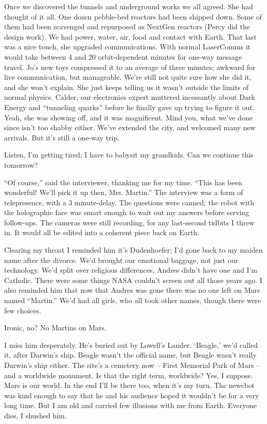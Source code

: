 \documentclass[11pt,a4paper]{article}
\newcommand{\storybreak}{%
  \par\vspace{0.6\baselineskip}
  \begin{center}\color{storyblue}\small *\enspace *\enspace *\end{center}
  \vspace{0.3\baselineskip}\noindent\ignorespaces
}
\begin{document}
Once we discovered the tunnels and underground works we all agreed. She had thought of it all. One dozen pebble-bed reactors had been shipped down. Some of them had been scavenged and repurposed as NextGen reactors (Percy did the design work). We had power, water, air, food and contact with Earth. That last was a nice touch, she upgraded communications. With normal LaserComms it would take between 4 and 20 orbit-dependent minutes for one-way message travel. Jo’s new toys compressed it to an average of three minutes; awkward for live communication, but manageable. We’re still not quite sure how she did it, and she won’t explain. She just keeps telling us it wasn’t outside the limits of normal physics. Calder, our electronics expert muttered incessantly about Dark Energy and “tunneling quarks” before he finally gave up trying to figure it out. Yeah, she was showing off, and it was magnificent. Mind you, what we’ve done since isn’t too shabby either. We’ve extended the city, and welcomed many new arrivals. But it’s still a one-way trip.

\storybreak

Listen, I’m getting tired; I have to babysit my grandkids. Can we continue this tomorrow?

“Of course,” said the interviewer, thanking me for my time. “This has been wonderful! We’ll pick it up then, Mrs. Martin.” The interview was a form of telepresence, with a 3 minute-delay. The questions were canned; the robot with the holographic face was smart enough to wait out my answers before serving follow-ups. The cameras were still recording, for any last-second tidbits I threw in. It would all be edited into a coherent piece back on Earth.

\storybreak

Clearing my throat I reminded him it’s Dudenhoefer; I’d gone back to my maiden name after the divorce. We’d brought our emotional baggage, not just our technology. We’d split over religious differences, Andres didn’t have one and I’m Catholic. There were some things NASA couldn’t screen out all those years ago. I also reminded him that now that Andres was gone there was no one left on Mars named “Martin.” We’d had all girls, who all took other names, though there were few choices.

Ironic, no? No Martins on Mars.

I miss him desperately. He’s buried out by Lowell’s Lander. ‘Beagle,’ we’d called it, after Darwin’s ship. Beagle wasn’t the official name, but Beagle wasn’t really Darwin’s ship either. The site’s a cemetery now – First Memorial Park of Mars – and a worldwide monument. Is that the right term, worldwide? Yes, I suppose. Mars is our world. In the end I’ll be there too, when it’s my turn. The newsbot was kind enough to say that he and his audience hoped it wouldn’t be for a very long time. But I am old and carried few illusions with me from Earth. Everyone dies, I shushed him.
\end{document}
